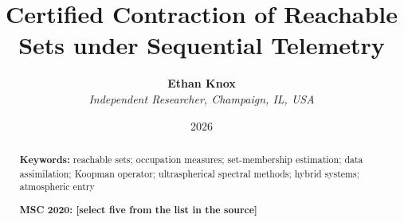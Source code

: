 \documentclass[english,11pt]{extarticle}
\begin{document}
\title{\textbf{Certified Contraction of Reachable Sets under Sequential Telemetry}}
\author{\textbf{Ethan Knox}\\
\textit{Independent Researcher, Champaign, IL, USA}}
\date{2026}
\maketitle

\begin{abstract}


\bigskip{}

\textbf{Keywords:} reachable sets; occupation measures; set-membership
estimation; data assimilation; Koopman operator; ultraspherical spectral
methods; hybrid systems; atmospheric entry

\medskip{}
\noindent\textbf{MSC 2020: [select five from the list in the source]}

\end{abstract}
\pagebreak{}

\tableofcontents{}
\pagebreak{}


\pagebreak{}


\pagebreak{}


\pagebreak{}


\pagebreak{}


\pagebreak{}


\pagebreak{}


\pagebreak{}



\pagebreak{}

\appendix




\end{document}
